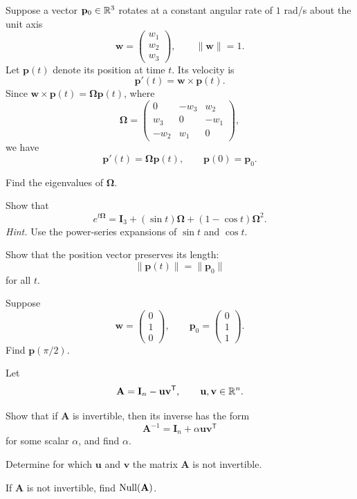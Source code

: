 \begin{problem}
Suppose a vector $\mathbf p_0\in\mathbb{R}^3$ rotates at a constant angular rate of $1$ rad/s about the unit axis
\[
\mathbf w=
\begin{pmatrix}
w_1\\w_2\\w_3
\end{pmatrix},
\qquad
\|\mathbf w\|=1.
\]
Let $\mathbf p(t)$ denote its position at time $t$. Its velocity is
\[
\mathbf p'(t)=\mathbf w\times\mathbf p(t).
\]
Since $\mathbf w\times\mathbf p(t)=\boldsymbol\Omega\mathbf p(t)$, where
\[
\boldsymbol\Omega=
\begin{pmatrix}
0&-w_3&w_2\\
w_3&0&-w_1\\
-w_2&w_1&0
\end{pmatrix},
\]
we have
\[
\mathbf p'(t)=\boldsymbol\Omega\mathbf p(t),
\qquad
\mathbf p(0)=\mathbf p_0.
\]
\begin{problemsubparts}
\item Find the eigenvalues of $\boldsymbol\Omega$.
\item Show that
\[
e^{t\boldsymbol\Omega}
=\mathbf I_3+(\sin t)\boldsymbol\Omega+(1-\cos t)\boldsymbol\Omega^2.
\]
\textit{Hint.} Use the power-series expansions of $\sin t$ and $\cos t$.
\item Show that the position vector preserves its length:
\[
\|\mathbf p(t)\|=\|\mathbf p_0\|
\]
for all $t$.
\item Suppose
\[
\mathbf w=
\begin{pmatrix}0\\1\\0\end{pmatrix},
\qquad
\mathbf p_0=
\begin{pmatrix}0\\1\\1\end{pmatrix}.
\]
Find $\mathbf p(\pi/2)$.
\end{problemsubparts}
\end{problem}

\begin{problem}
Let
\[
\mathbf A=\mathbf I_n-\mathbf u\mathbf v^{\mathsf T},
\qquad
\mathbf u,\mathbf v\in\mathbb{R}^n.
\]
\begin{problemsubparts}
\item Show that if $\mathbf A$ is invertible, then its inverse has the form
\[
\mathbf A^{-1}=\mathbf I_n+\alpha\mathbf u\mathbf v^{\mathsf T}
\]
for some scalar $\alpha$, and find $\alpha$.
\item Determine for which $\mathbf u$ and $\mathbf v$ the matrix $\mathbf A$ is not invertible.
\item If $\mathbf A$ is not invertible, find $\operatorname{Null}(\mathbf A)$.
\end{problemsubparts}
\end{problem}

